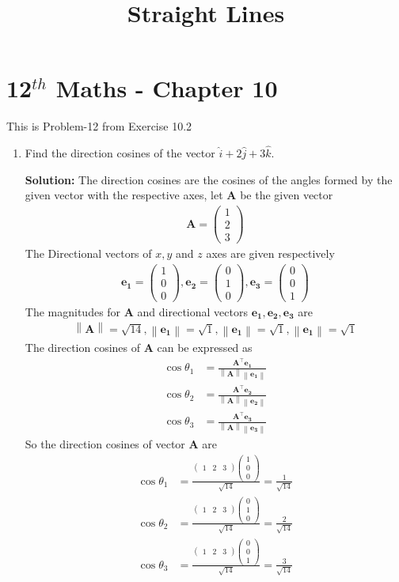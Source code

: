 \documentclass[12pt]{article}
\providecommand{\norm}[1]{\left\lVert#1\right\rVert}
\newcommand{\solution}{\noindent \textbf{Solution: }}
\newcommand{\myvec}[1]{\ensuremath{\begin{pmatrix}#1\end{pmatrix}}}
\let\vec\mathbf
\begin{document}
\begin{center}
\enlargethispage{-4cm}
\title{\textbf{Straight Lines}}
\date{\vspace{-5ex}} %
\maketitle
\end{center}
\setcounter{page}{1}
\section*{12$^{th}$ Maths - Chapter 10}
This is Problem-12 from Exercise 10.2
\begin{enumerate}
\item Find the direction cosines of the vector $\hat{i} +2\hat{j}+3\hat{k}$.

\solution The direction cosines are the cosines of the angles formed by the given vector with the respective axes, let $\vec{A}$ be the given vector
\begin{align}
	\vec{A} =\myvec{1\\2\\3}
\end{align}
The Directional vectors of $x,y$ and $z$ axes are given respectively 
\begin{align}
		\vec{e_1} =\myvec{1\\0\\0},\vec{e_2}=\myvec{0\\1\\0},\vec{e_3} =\myvec{0\\0\\1}
\end{align}
		The magnitudes for $\vec{A}$ and directional vectors $\vec{e_1},\vec{e_2},\vec{e_3}$ are
	\begin{align}
\norm{\vec{A}} =\sqrt{14},\norm{\vec{e_1}}=\sqrt{1},\norm{\vec{e_1}}=\sqrt{1},\norm{\vec{e_1}}=\sqrt{1}
	\end{align}
The direction cosines of $\vec{A}$ can be expressed as
\begin{align}
	\cos\theta_1 &=\frac{\vec{A}^\top\vec{e_1}}{\norm{\vec{A}}\norm{\vec{e_1}}}\\
	\cos\theta_2 &=\frac{\vec{A}^\top\vec{e_2}}{\norm{\vec{A}}\norm{\vec{e_2}}}\\
	\cos\theta_3 &=\frac{\vec{A}^\top\vec{e_3}}{\norm{\vec{A}}\norm{\vec{e_3}}}
\end{align}
		So the direction cosines of vector $\vec{A}$ are
\begin{align}
	\cos\theta_1 &=\frac{\myvec{1&2&3}\myvec{1\\0\\0}}{\sqrt{14}}=\frac{1}{\sqrt{14}}\\
	\cos\theta_2 &=\frac{\myvec{1&2&3}\myvec{0\\1\\0}}{\sqrt{14}}=\frac{2}{\sqrt{14}}\\
	\cos\theta_3 &=\frac{\myvec{1&2&3}\myvec{0\\0\\1}}{\sqrt{14}}=\frac{3}{\sqrt{14}}
\end{align}
\end{enumerate}
\end{document}
